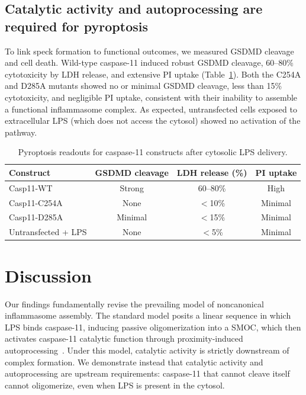 \documentclass[11pt,a4paper]{article}
\begin{document}
\subsection{Catalytic activity and autoprocessing are required for pyroptosis}

To link speck formation to functional outcomes, we measured GSDMD cleavage and cell death. Wild-type caspase-11 induced robust GSDMD cleavage, 60--80\% cytotoxicity by LDH release, and extensive PI uptake (Table~\ref{tab:pyroptosis}). Both the C254A and D285A mutants showed no or minimal GSDMD cleavage, less than 15\% cytotoxicity, and negligible PI uptake, consistent with their inability to assemble a functional inflammasome complex. As expected, untransfected cells exposed to extracellular LPS (which does not access the cytosol) showed no activation of the pathway.

\begin{table}[htbp]
\centering
\caption{Pyroptosis readouts for caspase-11 constructs after cytosolic LPS delivery.}
\label{tab:pyroptosis}
\begin{tabular}{@{}lccc@{}}
\toprule
\textbf{Construct} & \textbf{GSDMD cleavage} & \textbf{LDH release (\%)} & \textbf{PI uptake} \\
\midrule
Casp11-WT          & Strong  & 60--80\% & High \\
Casp11-C254A       & None    & $<$10\%  & Minimal \\
Casp11-D285A       & Minimal & $<$15\%  & Minimal \\
Untransfected + LPS & None   & $<$5\%   & Minimal \\
\bottomrule
\end{tabular}
\end{table}

\section{Discussion}
\label{sec:discussion}

Our findings fundamentally revise the prevailing model of noncanonical inflammasome assembly. The standard model posits a linear sequence in which LPS binds caspase-11, inducing passive oligomerization into a SMOC, which then activates caspase-11 catalytic function through proximity-induced autoprocessing~\citep{broz2016, shi2014}. Under this model, catalytic activity is strictly downstream of complex formation. We demonstrate instead that catalytic activity and autoprocessing are upstream requirements: caspase-11 that cannot cleave itself cannot oligomerize, even when LPS is present in the cytosol.
\end{document}
